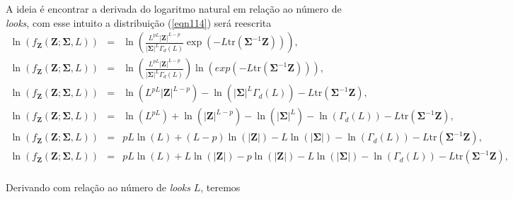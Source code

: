 \documentclass[12pt,a4paper]{article}
\begin{document}
A ideia é encontrar a derivada do logaritmo natural em relação ao número de {\it looks}, com esse intuito a distribuição (\ref{eqn114}) será reescrita
\begin{equation}\label{eqn115}
\begin{array}{ccc}
	\ln{\left(f_{\mathbf{Z}}(\mathbf{Z};\mathbf{\Sigma},L)\right)}&=&\ln{\left(\frac{L^{pL}|\mathbf{Z}|^{L-p}}{|\mathbf{\Sigma}|^{L}\Gamma_d(L)} \exp(-L\mathrm{tr}{(\mathbf{\Sigma}^{-1}\mathbf{Z})})\right)}, \\
	\ln{\left(f_{\mathbf{Z}}(\mathbf{Z};\mathbf{\Sigma},L)\right)}&=&\ln{\left(\frac{L^{pL}|\mathbf{Z}|^{L-p}}{|\mathbf{\Sigma}|^{L}\Gamma_d(L)}\right)}\ln{\left( exp(-L\mathrm{tr}{(\mathbf{\Sigma}^{-1}\mathbf{Z})})\right)}, \\
	\ln{\left(f_{\mathbf{Z}}(\mathbf{Z};\mathbf{\Sigma},L)\right)}&=&\ln{\left(L^{pL}|\mathbf{Z}|^{L-p}\right)} - \ln{\left(|\mathbf{\Sigma}|^{L}\Gamma_d(L)\right)}-L\mathrm{tr}{(\mathbf{\Sigma}^{-1}\mathbf{Z})}, \\
	\ln{\left(f_{\mathbf{Z}}(\mathbf{Z};\mathbf{\Sigma},L)\right)}&=&\ln{\left(L^{pL}\right)}+\ln{\left( |\mathbf{Z}|^{L-p}\right)} - \ln{\left(|\mathbf{\Sigma}|^{L}\right)}-\ln{\left(\Gamma_d(L)\right)}-L\mathrm{tr}{(\mathbf{\Sigma}^{-1}\mathbf{Z})}, \\
	\ln{\left(f_{\mathbf{Z}}(\mathbf{Z};\mathbf{\Sigma},L)\right)}&=&pL\ln{\left(L\right)}+(L-p)\ln{\left( |\mathbf{Z}|\right)} - L\ln{\left(|\mathbf {\Sigma}|\right)}-\ln{\left(\Gamma_d(L)\right)}-L\mathrm{tr}{(\mathbf{\Sigma}^{-1}\mathbf {Z})}, \\
	\ln{\left(f_{\mathbf{Z}}(\mathbf{Z};\mathbf{\Sigma},L)\right)}&=&pL\ln{\left(L\right)}+L\ln{\left( |\mathbf{Z}|\right)}-p\ln{\left( |\mathbf{Z}|\right)}- L\ln{\left(|\mathbf{\Sigma}|\right)}-\ln{\left(\Gamma_d(L)\right)}-L\mathrm{tr}{(\mathbf{\Sigma}^{-1}\mathbf {Z})}, \\
\end{array}
\end{equation}


Derivando com relação ao número de {\it looks} $L$, teremos
\end{document}
